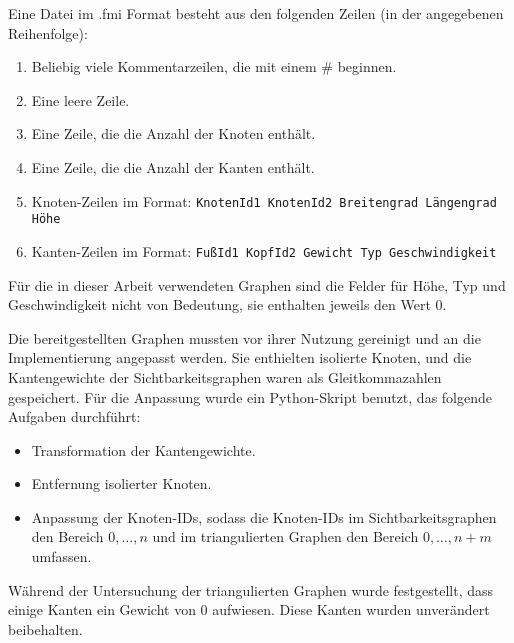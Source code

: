 \begin{definition}
    Eine Datei im .fmi Format besteht aus den folgenden Zeilen (in der angegebenen Reihenfolge):
    \begin{enumerate}
        \item
              Beliebig viele Kommentarzeilen, die mit einem \# beginnen.

        \item
              Eine leere Zeile.

        \item
              Eine Zeile, die die Anzahl der Knoten enthält.

        \item
              Eine Zeile, die die Anzahl der Kanten enthält.

        \item
              Knoten-Zeilen im Format: \texttt{KnotenId1 KnotenId2 Breitengrad Längengrad Höhe}

        \item
              Kanten-Zeilen im Format: \texttt{FußId1 KopfId2 Gewicht Typ Geschwindigkeit}

    \end{enumerate}
\end{definition}

Für die in dieser Arbeit verwendeten Graphen sind die Felder für Höhe, Typ und Geschwindigkeit nicht von Bedeutung, sie enthalten jeweils den Wert 0.

Die bereitgestellten Graphen mussten vor ihrer Nutzung gereinigt und an die Implementierung angepasst werden.
Sie enthielten isolierte Knoten, und die Kantengewichte der Sichtbarkeitsgraphen waren als Gleitkommazahlen gespeichert.
Für die Anpassung wurde ein Python-Skript benutzt, das folgende Aufgaben durchführt:

\begin{itemize}
    \item
          Transformation der Kantengewichte.

    \item
          Entfernung isolierter Knoten.

    \item
          Anpassung der Knoten-IDs, sodass die Knoten-IDs im Sichtbarkeitsgraphen den Bereich $0, \dotsc, n$ und im triangulierten Graphen den Bereich $0, \dotsc, n + m$ umfassen.
\end{itemize}

Während der Untersuchung der triangulierten Graphen wurde festgestellt, dass einige Kanten ein Gewicht von 0 aufwiesen.
Diese Kanten wurden unverändert beibehalten.

